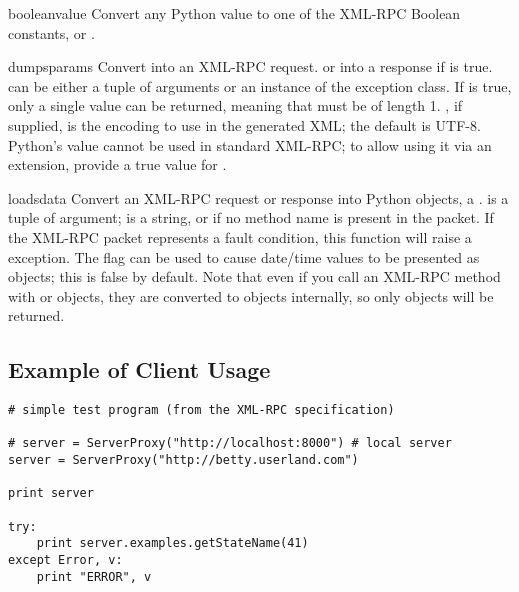 \begin{funcdesc}{boolean}{value}
Convert any Python value to one of the XML-RPC Boolean constants,
 or .
\end{funcdesc}

\begin{funcdesc}{dumps}{params}
Convert  into an XML-RPC request.
or into a response if  is true.
 can be either a tuple of arguments or an instance of the 
 exception class.  If  is true,
only a single value can be returned, meaning that  must be of length 1.
, if supplied, is the encoding to use in the generated
XML; the default is UTF-8.  Python's  value cannot be
used in standard XML-RPC; to allow using it via an extension, 
provide a true value for .
\end{funcdesc}

\begin{funcdesc}{loads}{data}
Convert an XML-RPC request or response into Python objects, a
.   is a tuple of argument; 
is a string, or  if no method name is present in the packet.
If the XML-RPC packet represents a fault condition, this
function will raise a  exception.
The  flag can be used to cause date/time values to be
presented as  objects; this is false
by default.
Note that even if you call an XML-RPC method with
 or 
objects, they are converted to  objects internally, so only
{} objects will be returned.

\end{funcdesc}



\subsection{Example of Client Usage \label{xmlrpc-client-example}}

\begin{verbatim}
# simple test program (from the XML-RPC specification)

# server = ServerProxy("http://localhost:8000") # local server
server = ServerProxy("http://betty.userland.com")

print server

try:
    print server.examples.getStateName(41)
except Error, v:
    print "ERROR", v
\end{verbatim}

